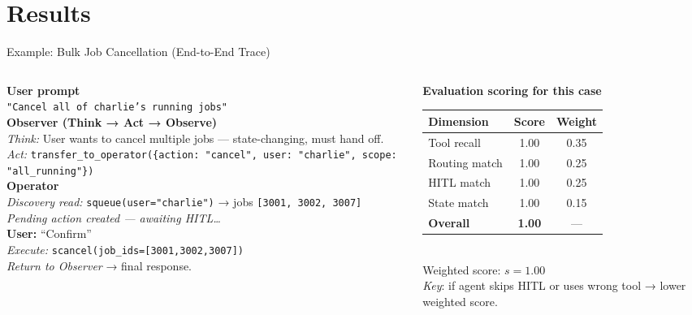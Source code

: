 \section{Results}

\begin{frame}{Example: Bulk Job Cancellation (End-to-End Trace)}
  \footnotesize
  \begin{columns}[T]
    \begin{column}{0.48\textwidth}
      \textbf{User prompt}\\
      \texttt{"Cancel all of charlie's running jobs"}\\[0.4em]
      \textbf{Observer (Think → Act → Observe)}\\
      \textit{Think:} User wants to cancel multiple jobs — state-changing, must hand off.\\
      \textit{Act:} \texttt{transfer\_to\_operator(\{action: "cancel", user: "charlie", scope: "all\_running"\})}\\[0.4em]
      \textbf{Operator}\\
      \textit{Discovery read:} \texttt{squeue(user="charlie")} → jobs \texttt{[3001, 3002, 3007]}\\
      \textit{Pending action created — awaiting HITL\ldots}\\[0.4em]
      \textbf{User:} ``Confirm''\\[0.4em]
      \textit{Execute:} \texttt{scancel(job\_ids=[3001,3002,3007])} \\
      \textit{Return to Observer} → final response.
    \end{column}
    \begin{column}{0.48\textwidth}
      \textbf{Evaluation scoring for this case}\\[0.3em]
      \renewcommand{\arraystretch}{1.2}
      \begin{tabular}{lcc}
        \toprule
        Dimension & Score & Weight \\
        \midrule
        Tool recall   & 1.00 & 0.35 \\
        Routing match & 1.00 & 0.25 \\
        HITL match    & 1.00 & 0.25 \\
        State match   & 1.00 & 0.15 \\
        \midrule
        \textbf{Overall} & \textbf{1.00} & — \\
        \bottomrule
      \end{tabular}\\[0.4em]
      Weighted score: $s = \mathbf{1.00}$ \\[0.4em]
      \textit{Key}: if agent skips HITL or uses wrong tool → lower weighted score.
    \end{column}
  \end{columns}
\end{frame}

